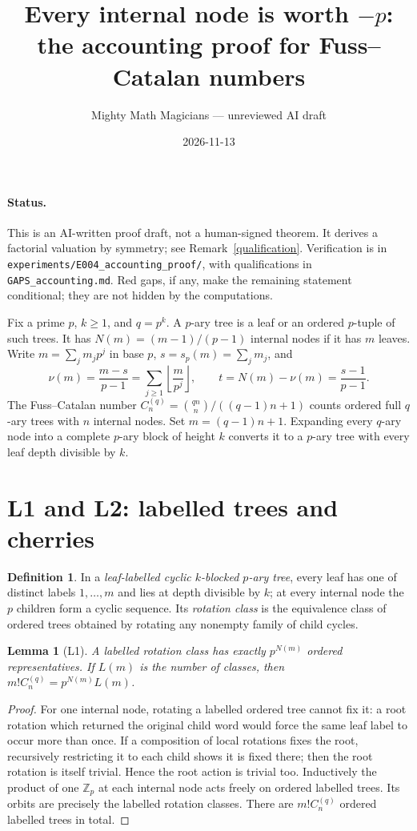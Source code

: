 \documentclass[10pt]{article}
\title{Every internal node is worth $-p$:\\the accounting proof for Fuss--Catalan numbers}
\author{Mighty Math Magicians --- unreviewed AI draft}
\date{2026-11-13}
\newtheorem{lemma}{Lemma}
\theoremstyle{definition}\newtheorem*{definition}{Definition}
\theoremstyle{remark}\newtheorem*{remark}{Remark}
\begin{document}
\maketitle
\paragraph{Status.} This is an AI-written proof draft, not a human-signed theorem.
It derives a factorial valuation by symmetry; see Remark~\ref{qualification}.
Verification is in \texttt{experiments/E004\_accounting\_proof/}, with
qualifications in \texttt{GAPS\_accounting.md}. Red gaps, if any, make the
remaining statement conditional; they are not hidden by the computations.

Fix a prime $p$, $k\ge1$, and $q=p^k$. A $p$-ary tree is a leaf or an ordered
$p$-tuple of such trees. It has $N(m)=(m-1)/(p-1)$ internal nodes if it has $m$
leaves. Write $m=\sum_jm_jp^j$ in base $p$, $s=s_p(m)=\sum_jm_j$, and
\[
 \nu(m)=\frac{m-s}{p-1}=\sum_{j\ge1}\left\lfloor\frac m{p^j}\right\rfloor,
 \qquad t=N(m)-\nu(m)=\frac{s-1}{p-1}.
\]
The Fuss--Catalan number $C_n^{(q)}=\binom{qn}{n}/((q-1)n+1)$ counts ordered
full $q$-ary trees with $n$ internal nodes. Set $m=(q-1)n+1$. Expanding every
$q$-ary node into a complete $p$-ary block of height $k$ converts it to a
$p$-ary tree with every leaf depth divisible by $k$.

\section{L1 and L2: labelled trees and cherries}
\begin{definition} In a \emph{leaf-labelled cyclic $k$-blocked $p$-ary tree},
every leaf has one of distinct labels $1,\ldots,m$ and lies at depth divisible
by $k$; at every internal node the $p$ children form a cyclic sequence. Its
\emph{rotation class} is the equivalence class of ordered trees obtained by
rotating any nonempty family of child cycles.\end{definition}

\begin{lemma}[L1]\label{L1} A labelled rotation class has exactly $p^{N(m)}$
ordered representatives. If $L(m)$ is the number of classes, then
$m!C_n^{(q)}=p^{N(m)}L(m)$.\end{lemma}
\begin{proof} For one internal node, rotating a labelled ordered tree cannot
fix it: a root rotation which returned the original child word would force
the same leaf label to occur more than once. If a composition of local rotations
fixes the root, recursively restricting it to each child shows it is fixed there;
then the root rotation is itself trivial. Hence the root action is trivial too.
Inductively the product of one $\mathbb Z_p$ at each internal node acts freely
on ordered labelled trees. Its orbits are precisely the labelled rotation
classes. There are $m!C_n^{(q)}$ ordered labelled trees in total.\end{proof}
\end{document}
